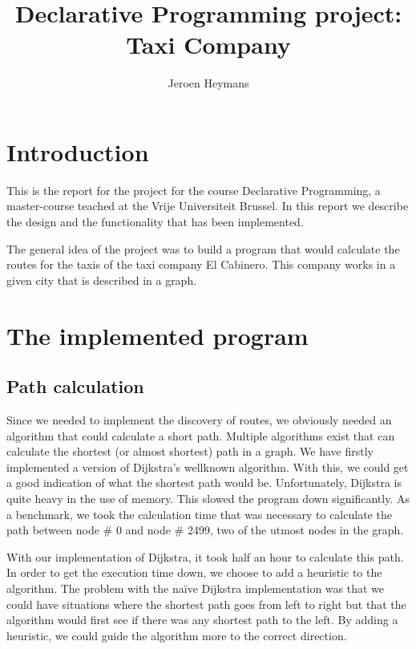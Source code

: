\documentclass[10pt,a4paper]{article}
\author{Jeroen Heymans}
\title{Declarative Programming project: Taxi Company}
\begin{document}
\maketitle
\tableofcontents

\section{Introduction}
This is the report for the project for the course Declarative Programming, a master-course teached at the Vrije Universiteit Brussel. In this report we describe the design and the functionality that has been implemented.

The general idea of the project was to build a program that would calculate the routes for the taxis of the taxi company El Cabinero. This company works in a given city that is described in a graph.

\section{The implemented program}

\subsection{Path calculation}

Since we needed to implement the discovery of routes, we obviously needed an algorithm that could calculate a short path. Multiple algorithms exist that can calculate the shortest (or almost shortest) path in a graph. We have firstly implemented a version of Dijkstra's wellknown algorithm. With this, we could get a good indication of what the shortest path would be. Unfortunately, Dijkstra is quite heavy in the use of memory. This slowed the program down significantly. As a benchmark, we took the calculation time that was necessary to calculate the path between node \# 0 and node \# 2499, two of the utmost nodes in the graph.

With our implementation of Dijkstra, it took half an hour to calculate this path. In order to get the execution time down, we choose to add a heuristic to the algorithm. The problem with the naïve Dijkstra implementation was that we could have situations where the shortest path goes from left to right but that the algorithm would first see if there was any shortest path to the left. By adding a heuristic, we could guide the algorithm more to the correct direction.
\end{document}
